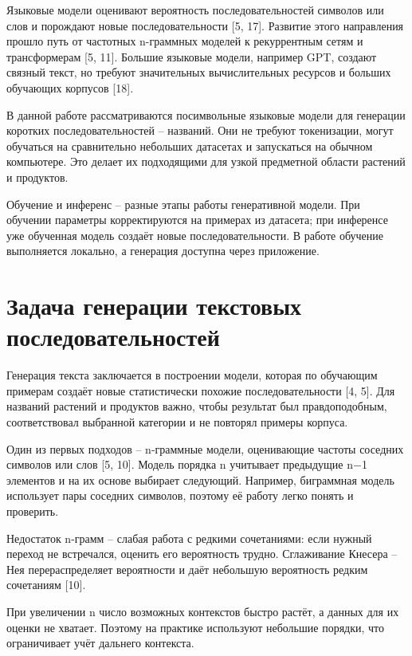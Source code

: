 Языковые модели оценивают вероятность последовательностей символов или слов и порождают новые последовательности {[}5, 17{]}. Развитие этого направления прошло путь от частотных n-граммных моделей к рекуррентным сетям и трансформерам {[}5, 11{]}. Большие языковые модели, например GPT, создают связный текст, но требуют значительных вычислительных ресурсов и больших обучающих корпусов {[}18{]}.

В данной работе рассматриваются посимвольные языковые модели для генерации коротких последовательностей -- названий. Они не требуют токенизации, могут обучаться на сравнительно небольших датасетах и запускаться на обычном компьютере. Это делает их подходящими для узкой предметной области растений и продуктов.

Обучение и инференс -- разные этапы работы генеративной модели. При обучении параметры корректируются на примерах из датасета; при инференсе уже обученная модель создаёт новые последовательности. В работе обучение выполняется локально, а генерация доступна через приложение.

\section{Задача генерации текстовых последовательностей}\label{ux437ux430ux434ux430ux447ux430-ux433ux435ux43dux435ux440ux430ux446ux438ux438-ux442ux435ux43aux441ux442ux43eux432ux44bux445-ux43fux43eux441ux43bux435ux434ux43eux432ux430ux442ux435ux43bux44cux43dux43eux441ux442ux435ux439}

Генерация текста заключается в построении модели, которая по обучающим примерам создаёт новые статистически похожие последовательности {[}4, 5{]}. Для названий растений и продуктов важно, чтобы результат был правдоподобным, соответствовал выбранной категории и не повторял примеры корпуса.

Один из первых подходов -- n-граммные модели, оценивающие частоты соседних символов или слов {[}5, 10{]}. Модель порядка n учитывает предыдущие n−1 элементов и на их основе выбирает следующий. Например, биграммная модель использует пары соседних символов, поэтому её работу легко понять и проверить.

Недостаток n-грамм -- слабая работа с редкими сочетаниями: если нужный переход не встречался, оценить его вероятность трудно. Сглаживание Кнесера -- Нея перераспределяет вероятности и даёт небольшую вероятность редким сочетаниям {[}10{]}.

При увеличении n число возможных контекстов быстро растёт, а данных для их оценки не хватает. Поэтому на практике используют небольшие порядки, что ограничивает учёт дальнего контекста.

